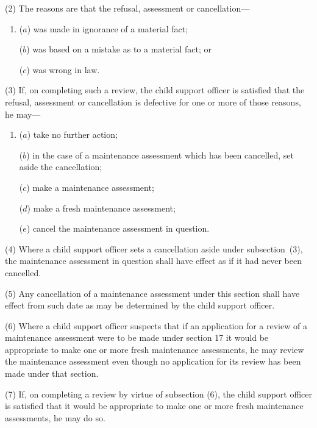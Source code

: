\documentclass[12pt,a4paper]{article}
\begin{document}
(2) The reasons are that the refusal, assessment or cancellation—
\begin{enumerate}\item[]
($a$) was made in ignorance of a material fact;

($b$) was based on a mistake as to a material fact; or

($c$) was wrong in law.
\end{enumerate}

(3) If, on completing such a review, the child support officer is satisfied that the refusal, assessment or cancellation is defective for one or more of those reasons, he may—
\begin{enumerate}\item[]
($a$) take no further action;

($b$) in the case of a maintenance assessment which has been cancelled, set aside the cancellation;

($c$) make a maintenance assessment;

($d$) make a fresh maintenance assessment;

($e$) cancel the maintenance assessment in question.
\end{enumerate}

(4) Where a child support officer sets a cancellation aside under subsection~(3), the maintenance assessment in question shall have effect as if it had never been cancelled.

(5) Any cancellation of a maintenance assessment under this section shall have effect from such date as may be determined by the child support officer.

(6) Where a child support officer suspects that if an application for a review of a maintenance assessment were to be made under section 17 it would be appropriate to make one or more fresh maintenance assessments, he may review the maintenance assessment even though no application for its review has been made under that section.

(7) If, on completing a review by virtue of subsection (6), the child support officer is satisfied that it would be appropriate to make one or more fresh maintenance assessments, he may do so.

\end{document}
